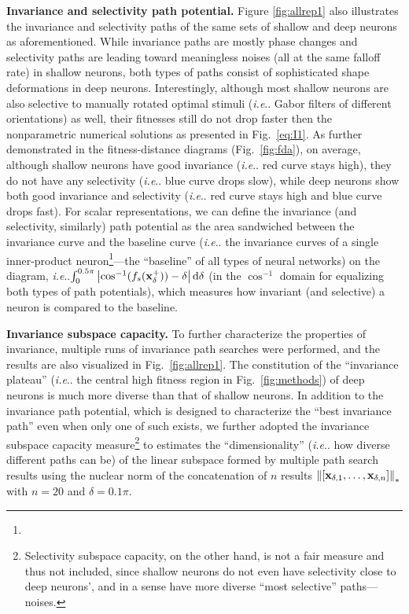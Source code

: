 \documentclass[fleqn]{article} %
\makeatletter
\DeclareRobustCommand\onedot{\futurelet\@let@token\@onedot}
\def\@onedot{\ifx\@let@token.\else.\null\fi\xspace}
\def\ie{\emph{i.e}\onedot} \def\Ie{\emph{I.e}\onedot}
\makeatother
\begin{document}
{\bf Invariance and selectivity path potential.}
Figure \ref{fig:allrep1} also illustrates the invariance and selectivity paths of the same sets of shallow and deep neurons as aforementioned.
While invariance paths are mostly phase changes and selectivity paths are leading toward meaningless noises (all at the same falloff rate) in shallow neurons, both types of paths consist of sophisticated shape deformations in deep neurons.
Interestingly, although most shallow neurons are also selective to manually rotated optimal stimuli (\ie Gabor filters of different orientations) as well, their fitnesses still do not drop faster then the nonparametric numerical solutions as presented in Fig.~\ref{eq:I1}.
As further demonstrated in the fitness-distance diagrams \cite{jones1995fitness} (Fig.~\ref{fig:fda}), on average, although shallow neurons have good invariance (\ie red curve stays high), they do not have any selectivity (\ie blue curve drops slow), while deep neurons show both good invariance and selectivity (\ie red curve stays high and blue curve drops fast).
For scalar representations, we can define the invariance (and selectivity, similarly) path potential as the area sandwiched between the invariance curve and the baseline curve (\ie the invariance curves of a single inner-product neuron\footnote{}---the ``baseline'' of all types of neural networks) on the diagram, \ie $\int_{0}^{0.5\pi} \left| \cos^{-1}(f_s(\bf{x}^{+}_{\delta} )) - \delta \right| \mathrm{d}\delta$ (in the $\cos^{-1}$ domain for equalizing both types of path potentials), which measures how invariant (and selective) a neuron is compared to the baseline. %


\newcommand{\expnoslsc}{Selectivity subspace capacity, on the other hand, is not a fair measure and thus not included, since shallow neurons do not even have selectivity close to deep neurons', and in a sense have more diverse ``most selective'' paths---noises.}

{\bf Invariance subspace capacity.}
To further characterize the properties of invariance, multiple runs of invariance path searches {were} performed, and the results are also visualized in Fig.~\ref{fig:allrep1}.
The constitution of the ``invariance plateau'' (\ie the central high fitness region in Fig.~\ref{fig:methods}) of deep neurons is much more diverse than that of shallow neurons.
In addition to the invariance path potential, which is designed to characterize the ``best invariance path'' even when only one of such exists, we further adopted the invariance subspace capacity measure\footnote{\expnoslsc} to estimates the ``dimensionality'' (\ie how diverse different paths can be) of the linear subspace formed by multiple path search results using the nuclear norm of the concatenation of $n$ results $\left\|\left[{\bf{x}}_{\delta,1},\dots,{\bf{x}}_{\delta,n}\right]\right\|_{*}$ with $n=20$ and $\delta=0.1\pi$.
\end{document}
